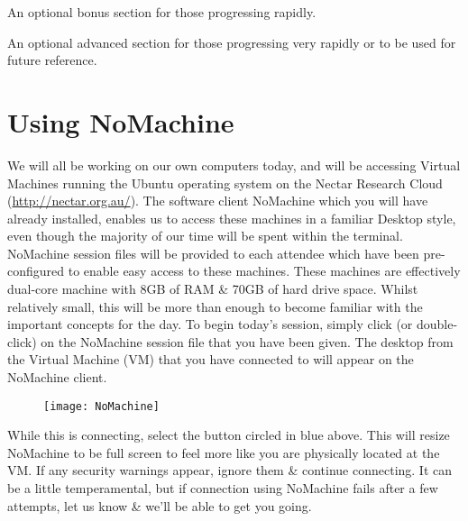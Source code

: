 \begin{bonus}
An optional bonus section for those progressing rapidly. \\
\end{bonus}

\begin{advanced}
An optional advanced section for those progressing very rapidly or to be used for future reference. \\
\end{advanced}

\section{Using NoMachine} \label{sec:NoMachine}
\begin{information}
We will all be working on our own computers today, and will be accessing Virtual Machines running the Ubuntu operating system on the Nectar Research Cloud (\url{http://nectar.org.au/}).
The software client NoMachine which you will have already installed, enables us to access these machines in a familiar Desktop style, even though the majority of our time will be spent within the terminal. \\

NoMachine session files will be provided to each attendee which have been pre-configured to enable easy access to these machines.
These machines are effectively dual-core machine with 8GB of RAM \& 70GB of hard drive space.
Whilst relatively small, this will be more than enough to become familiar with the important concepts for the day.
To begin today's session, simply click (or double-click) on the NoMachine session file that you have been given.
The desktop from the Virtual Machine (VM) that you have connected to will appear on the NoMachine client. \\
\end{information}

\begin{figure}[h!]
  \centering
    \texttt{[image: NoMachine]}
\end{figure}

\begin{information}
While this is connecting, select the button circled in blue above.
This will resize NoMachine to be full screen to feel more like you are physically located at the VM.
If any security warnings appear, ignore them \& continue connecting. 
It can be a little temperamental, but if connection using NoMachine fails after a few attempts, let us know \& we'll be able to get you going.\\
\end{information}

